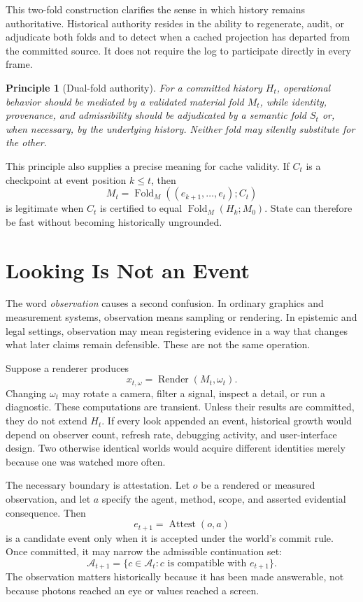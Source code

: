 \documentclass[11pt]{article}
\newtheorem{principle}{Principle}
\newcommand{\Fold}{\operatorname{Fold}}
\newcommand{\Render}{\operatorname{Render}}
\newcommand{\Attest}{\operatorname{Attest}}
\begin{document}
This two-fold construction clarifies the sense in which history remains authoritative. Historical authority resides in the ability to regenerate, audit, or adjudicate both folds and to detect when a cached projection has departed from the committed source. It does not require the log to participate directly in every frame.

\begin{principle}[Dual-fold authority]
For a committed history $H_t$, operational behavior should be mediated by a validated material fold $M_t$, while identity, provenance, and admissibility should be adjudicated by a semantic fold $S_t$ or, when necessary, by the underlying history. Neither fold may silently substitute for the other.
\end{principle}

This principle also supplies a precise meaning for cache validity. If $C_t$ is a checkpoint at event position $k\leq t$, then
\[
M_t=\Fold_M((e_{k+1},\ldots,e_t);C_t)
\]
is legitimate when $C_t$ is certified to equal $\Fold_M(H_k;M_0)$. State can therefore be fast without becoming historically ungrounded.

\section{Looking Is Not an Event}

The word \emph{observation} causes a second confusion. In ordinary graphics and measurement systems, observation means sampling or rendering. In epistemic and legal settings, observation may mean registering evidence in a way that changes what later claims remain defensible. These are not the same operation.

Suppose a renderer produces
\[
x_{t,\omega}=\Render(M_t,\omega_t).
\]
Changing $\omega_t$ may rotate a camera, filter a signal, inspect a detail, or run a diagnostic. These computations are transient. Unless their results are committed, they do not extend $H_t$. If every look appended an event, historical growth would depend on observer count, refresh rate, debugging activity, and user-interface design. Two otherwise identical worlds would acquire different identities merely because one was watched more often.

The necessary boundary is attestation. Let $o$ be a rendered or measured observation, and let $a$ specify the agent, method, scope, and asserted evidential consequence. Then
\[
e_{t+1}=\Attest(o,a)
\]
is a candidate event only when it is accepted under the world's commit rule. Once committed, it may narrow the admissible continuation set:
\[
\mathcal{A}_{t+1}
=\{c\in\mathcal{A}_t: c\text{ is compatible with }e_{t+1}\}.
\]
The observation matters historically because it has been made answerable, not because photons reached an eye or values reached a screen.
\end{document}

